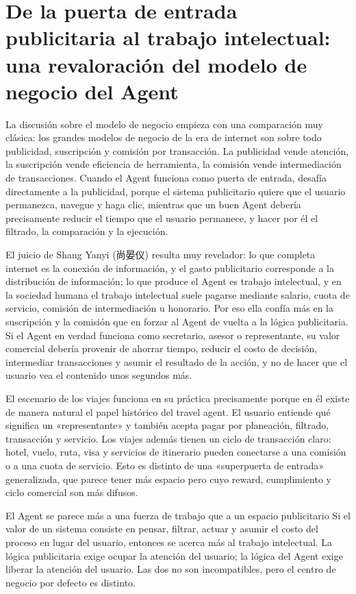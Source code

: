 \section{De la puerta de entrada publicitaria al trabajo intelectual: una revaloración del modelo de negocio del Agent}

La discusión sobre el modelo de negocio empieza con una comparación muy clásica: los grandes modelos de negocio de la era de internet son sobre todo publicidad, suscripción y comisión por transacción. La publicidad vende atención, la suscripción vende eficiencia de herramienta, la comisión vende intermediación de transacciones. Cuando el Agent funciona como puerta de entrada, desafía directamente a la publicidad, porque el sistema publicitario quiere que el usuario permanezca, navegue y haga clic, mientras que un buen Agent debería precisamente reducir el tiempo que el usuario permanece, y hacer por él el filtrado, la comparación y la ejecución.

El juicio de Shang Yanyi (尚晏仪) resulta muy revelador: lo que completa internet es la conexión de información, y el gasto publicitario corresponde a la distribución de información; lo que produce el Agent es trabajo intelectual, y en la sociedad humana el trabajo intelectual suele pagarse mediante salario, cuota de servicio, comisión de intermediación u honorario. Por eso ella confía más en la suscripción y la comisión que en forzar al Agent de vuelta a la lógica publicitaria. Si el Agent en verdad funciona como secretario, asesor o representante, su valor comercial debería provenir de ahorrar tiempo, reducir el costo de decisión, intermediar transacciones y asumir el resultado de la acción, y no de hacer que el usuario vea el contenido unos segundos más.

El escenario de los viajes funciona en su práctica precisamente porque en él existe de manera natural el papel histórico del travel agent. El usuario entiende qué significa un «representante» y también acepta pagar por planeación, filtrado, transacción y servicio. Los viajes además tienen un ciclo de transacción claro: hotel, vuelo, ruta, visa y servicios de itinerario pueden conectarse a una comisión o a una cuota de servicio. Esto es distinto de una «superpuerta de entrada» generalizada, que parece tener más espacio pero cuyo reward, cumplimiento y ciclo comercial son más difusos.

\begin{importantbox}{El Agent se parece más a una fuerza de trabajo que a un espacio publicitario}
Si el valor de un sistema consiste en pensar, filtrar, actuar y asumir el costo del proceso en lugar del usuario, entonces se acerca más al trabajo intelectual. La lógica publicitaria exige ocupar la atención del usuario; la lógica del Agent exige liberar la atención del usuario. Las dos no son incompatibles, pero el centro de negocio por defecto es distinto.
\end{importantbox}

